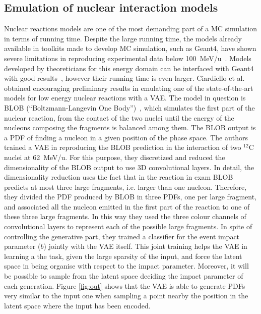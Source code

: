 \subsection{Emulation of nuclear interaction models}
Nuclear reactions models are one of the most demanding part of a MC simulation in terms of running time. Despite the large running time, the models already available in toolkits made to develop MC simulation, such as Geant4, have shown severe limitations in reproducing experimental data below 100~MeV/u~\cite{g4-med}. Models developed by theoreticians for this energy domain can be interfaced with Geant4 with good results~\cite{blob-g4}, however their running time is even larger. Ciardiello et al.~\cite{blob-emulation} obtained encouraging preliminary results 
in emulating one of the state-of-the-art models for low energy nuclear reactions with a VAE. The model in question is BLOB (``Boltzmann-Langevin One Body'')~\cite{blob}, which simulates the first part of the nuclear reaction, from the contact of the two nuclei until the energy of the nucleons composing the fragments is balanced among them. The BLOB output is a PDF of finding a nucleon in a given position of the phase space. The authors trained a VAE in reproducing the BLOB prediction in the interaction of two $^{12}$C nuclei at 62~MeV/u. For this purpose, they discretized and reduced the dimensionality of the BLOB output to use 3D convolutional layers. In detail, the dimensionality reduction uses the fact that in the reaction in exam BLOB predicts at most three large fragments, i.e. larger than one nucleon. Therefore, they divided the PDF produced by BLOB in three PDFs, one per large fragment, and associated all the nucleon emitted in the first part of the reaction to one of these three large fragments. In this way they used the three colour channels of convolutional layers to represent each of the possible large fragments. In spite of controlling the generative part, they trained a classifier for the event impact parameter ($b$) jointly with the VAE itself. This joint training helps the VAE in learning a the task, given the large sparsity of the input, and force the latent space in being organise with respect to the impact parameter. Moreover, it will be possible to sample from the latent space deciding the impact parameter of each generation.
Figure \ref{fig:out} shows that the VAE is able to generate PDFs very similar to the input one when sampling a point nearby the position in the latent space where the input has been encoded.



